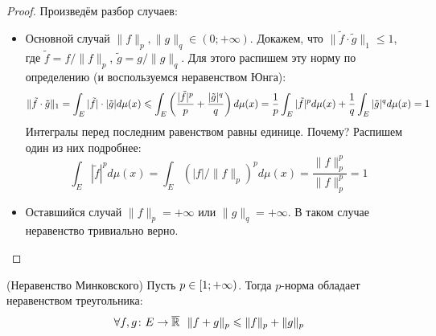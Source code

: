 \begin{proof}
	Произведём разбор случаев:
	\begin{itemize}
		\item Основной случай $\|f\|_p, \|g\|_q \in (0; +\infty)$. Докажем, что $\|\tilde{f} \cdot \tilde{g}\|_1 \le 1$, где $\tilde{f} = f / \|f\|_p$, $\tilde{g} = g / \|g\|_q$. Для этого распишем эту норму по определению (и воспользуемся неравенством Юнга):
		\[
			\|\tilde{f} \cdot \tilde{g}\|_1 = \int_E |\tilde{f}| \cdot |\tilde{g}|d\mu(x) \leqslant \int_E \left(\frac{|\tilde{f}|^p}{p} + \frac{|\tilde{g}|^q}{q}\right)d\mu(x) = \frac{1}{p} \int_E |\tilde{f}|^pd\mu(x) + \frac{1}{q} \int_E |\tilde{g}|^qd\mu(x) = 1
		\]
		Интегралы перед последним равенством равны единице. Почему? Распишем один из них подробнее:
		\[
			\int_E |\tilde{f}|^pd\mu(x) = \int_E (|f| / \|f\|_p)^pd\mu(x) = \frac{\|f\|_p^p}{\|f\|_p^p} = 1
		\]
		
		\item Оставшийся случай $\|f\|_p = +\infty$ или $\|g\|_q = +\infty$. В таком случае неравенство тривиально верно.
	\end{itemize}
\end{proof}

\begin{theorem} (Неравенство Минковского)
	Пусть $p \in \left[1; +\infty\right)$. Тогда $p$-норма обладает неравенством треугольника:
	\[
		\forall f, g \colon E \to \overline{\mathbb{R}}\ \ \|f + g\|_p \leqslant \|f\|_p + \|g\|_p
	\]
\end{theorem}

